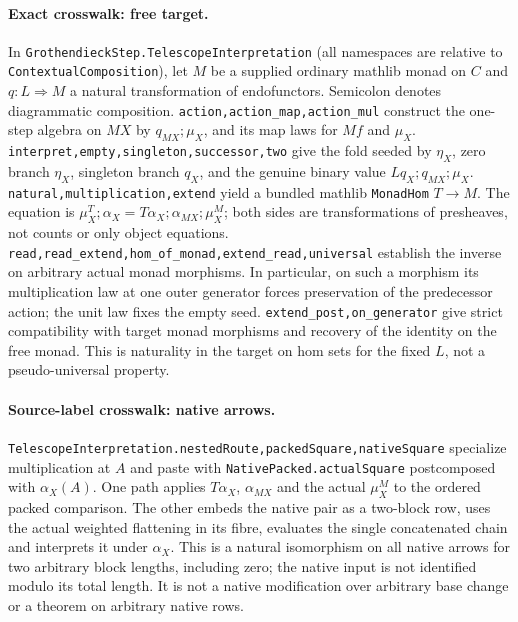 \paragraph{Exact crosswalk: free target.}
In \texttt{GrothendieckStep.TelescopeInterpretation} (all namespaces
are relative to \texttt{ContextualComposition}), let $M$ be a supplied
ordinary mathlib monad on $C$ and $q:L\Rightarrow M$ a natural
transformation of endofunctors. Semicolon denotes diagrammatic
composition. \texttt{action,action\_map,action\_mul} construct the
one-step algebra on $MX$ by $q_{MX};\mu_X$, and its map laws for $Mf$
and $\mu_X$. \texttt{interpret,empty,singleton,successor,two}
give the fold seeded by $\eta_X$, zero branch $\eta_X$, singleton
branch $q_X$, and the genuine binary value $Lq_X;q_{MX};\mu_X$.
\texttt{natural,multiplication,extend} yield a bundled mathlib
\texttt{MonadHom} $T\to M$. The equation is
$\mu^T_X;\alpha_X=T\alpha_X;\alpha_{MX};\mu^M_X$;
both sides are transformations of presheaves, not counts or only object
equations. \texttt{read,read\_extend,hom\_of\_monad,extend\_read,universal}
establish the inverse on arbitrary actual monad morphisms.
In particular, on such a morphism its multiplication law at one
outer generator forces preservation of the predecessor action; the unit
law fixes the empty seed. \texttt{extend\_post,on\_generator} give
strict compatibility with target monad morphisms and recovery of the
identity on the free monad. This is naturality in the target on hom
sets for the fixed $L$, not a pseudo-universal property.
\paragraph{Source-label crosswalk: native arrows.}
\texttt{TelescopeInterpretation.nestedRoute,packedSquare,nativeSquare}
specialize multiplication at $A$ and paste with
\texttt{NativePacked.actualSquare} postcomposed with $\alpha_X(A)$.
One path applies $T\alpha_X$, $\alpha_{MX}$ and the actual $\mu^M_X$
to the ordered packed comparison. The other embeds the native pair as
a two-block row, uses the actual weighted flattening in its fibre,
evaluates the single concatenated chain and interprets it under
$\alpha_X$. This is a natural isomorphism on all native arrows for two
arbitrary block lengths, including zero; the native input is not
identified modulo its total length. It is not a native modification
over arbitrary base change or a theorem on arbitrary native rows.

